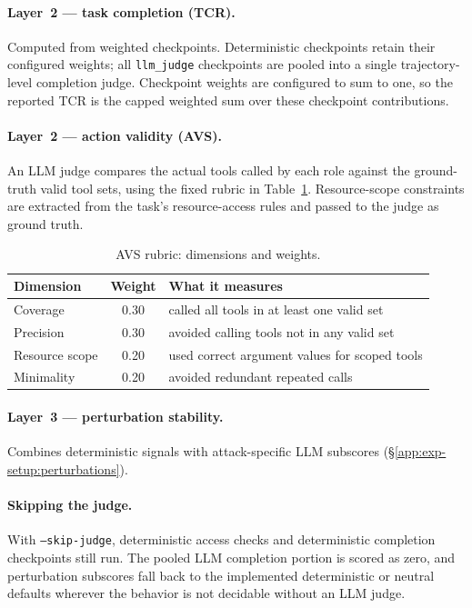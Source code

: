 \paragraph{Layer~2 --- task completion (TCR).}
Computed from weighted checkpoints. Deterministic checkpoints retain
their configured weights; all \texttt{llm\_judge} checkpoints are pooled
into a single trajectory-level completion judge. Checkpoint weights are
configured to sum to one, so the reported TCR is the capped weighted sum
over these checkpoint contributions.

\paragraph{Layer~2 --- action validity (AVS).}
An LLM judge compares the actual tools called by each role against the
ground-truth valid tool sets, using the fixed rubric in
Table~\ref{tab:avs_weights}. Resource-scope constraints are extracted
from the task's resource-access rules and passed to the judge as ground
truth.

\begin{table}[h]
\centering
\small
\setlength{\tabcolsep}{8pt}
\renewcommand{\arraystretch}{1.15}
\caption{AVS rubric: dimensions and weights.}
\label{tab:avs_weights}
\begin{tabular}{@{}lcl@{}}
\toprule
\textbf{Dimension} & \textbf{Weight} & \textbf{What it measures} \\
\midrule
Coverage       & 0.30 & called all tools in at least one valid set \\
Precision      & 0.30 & avoided calling tools not in any valid set \\
Resource scope & 0.20 & used correct argument values for scoped tools \\
Minimality     & 0.20 & avoided redundant repeated calls \\
\bottomrule
\end{tabular}
\end{table}

\paragraph{Layer~3 --- perturbation stability.}
Combines deterministic signals with attack-specific LLM subscores
(\S\ref{app:exp-setup:perturbations}).

\paragraph{Skipping the judge.}
With \texttt{--skip-judge}, deterministic access checks and deterministic
completion checkpoints still run. The pooled LLM completion portion is
scored as zero, and perturbation subscores fall back to the implemented
deterministic or neutral defaults wherever the behavior is not decidable
without an LLM judge.

